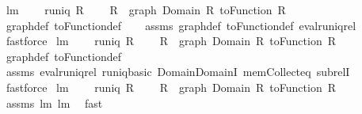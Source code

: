 \begin{isabellebody}
\isanewline
{}\isamarkupfalse%
\ lm{}{}{}{\isacharcolon}\ \isanewline
\ \ \ {\isachardoublequoteopen}runiq\ R{\isachardoublequoteclose}\ \isanewline
\ \ \ {\isachardoublequoteopen}R\ {\isasymsupseteq}\ graph\ {\isacharparenleft}Domain\ R{\isacharparenright}\ {\isacharparenleft}toFunction\ R{\isacharparenright}{\isachardoublequoteclose}\ \isanewline
%
\isadelimproof
\ \ %
\endisadelimproof
%
\isatagproof
{}\isamarkupfalse%
\ graph{\isacharunderscore}def\ toFunction{\isacharunderscore}def\isanewline
\ \ \isamarkupfalse%
\ assms\ graph{\isacharunderscore}def\ toFunction{\isacharunderscore}def\ eval{\isacharunderscore}runiq{\isacharunderscore}rel\ \isamarkupfalse%
\ fastforce%
\endisatagproof
{\isafoldproof}%
%
\isadelimproof
\isanewline
%
\endisadelimproof
\isanewline
{}\isamarkupfalse%
\ lm{}{}{}{\isacharcolon}\ \isanewline
\ \ \ {\isachardoublequoteopen}runiq\ R{\isachardoublequoteclose}\ \isanewline
\ \ \ {\isachardoublequoteopen}R\ {\isasymsubseteq}\ graph\ {\isacharparenleft}Domain\ R{\isacharparenright}\ {\isacharparenleft}toFunction\ R{\isacharparenright}{\isachardoublequoteclose}\ \isanewline
%
\isadelimproof
\ \ %
\endisadelimproof
%
\isatagproof
{}\isamarkupfalse%
\ graph{\isacharunderscore}def\ toFunction{\isacharunderscore}def\isanewline
\ \ \isamarkupfalse%
\ assms\ eval{\isacharunderscore}runiq{\isacharunderscore}rel\ runiq{\isacharunderscore}basic\ Domain{\isachardot}DomainI\ mem{\isacharunderscore}Collect{\isacharunderscore}eq\ subrelI\ \isamarkupfalse%
\ fastforce%
\endisatagproof
{\isafoldproof}%
%
\isadelimproof
\isanewline
%
\endisadelimproof
\isanewline
{}\isamarkupfalse%
\ lm{}{}{}{\isacharcolon}\ \isanewline
\ \ \ {\isachardoublequoteopen}runiq\ R{\isachardoublequoteclose}\ \isanewline
\ \ \ {\isachardoublequoteopen}R\ {\isacharequal}\ graph\ {\isacharparenleft}Domain\ R{\isacharparenright}\ {\isacharparenleft}toFunction\ R{\isacharparenright}{\isachardoublequoteclose}\isanewline
%
\isadelimproof
\ \ %
\endisadelimproof
%
\isatagproof
{}\isamarkupfalse%
\ assms\ lm{}{}{}\ lm{}{}{}\ \isamarkupfalse%
\ fast%
\endisatagproof
{\isafoldproof}%
%
\isadelimproof
\isanewline

\end{isabellebody}
